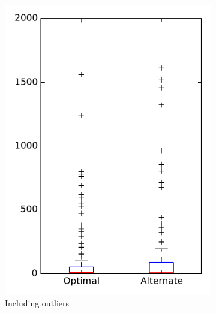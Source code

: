 
\begin{figure}
    \centering
    \begin{subfigure}{.4\textwidth}
        \centering
        \includegraphics[height=0.4\textheight]{figures/combo/flt_rq2_openjpa}
        \caption{Including outliers}\label{fig:combo:flt:rq2:openjpa_outlier}
    \end{subfigure}%
    \begin{subfigure}{.4\textwidth}
        \centering

\end{subfigure}
\end{figure}

